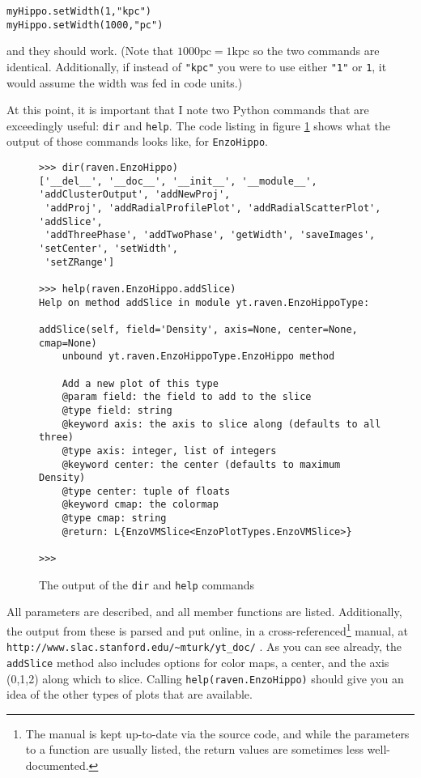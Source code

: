 \documentclass{article}
\begin{document}
\begin{verbatim}
myHippo.setWidth(1,"kpc")
myHippo.setWidth(1000,"pc")
\end{verbatim}

and they should work.  (Note that $1000\mbox{pc} = 1\mbox{kpc}$ so the two commands
are identical.  Additionally, if instead of \texttt{"kpc"} you were to use either
\texttt{"1"} or \texttt{1}, it would assume the width was fed in code units.)

At this point, it is important that I note two Python commands that are exceedingly
useful: \texttt{dir} and \texttt{help}.  The code listing in figure
\ref{dir_and_help} shows what the output of those commands looks like, for
\texttt{EnzoHippo}.

\begin{figure}
\begin{verbatim}
>>> dir(raven.EnzoHippo)
['__del__', '__doc__', '__init__', '__module__', 'addClusterOutput', 'addNewProj',
 'addProj', 'addRadialProfilePlot', 'addRadialScatterPlot', 'addSlice',
 'addThreePhase', 'addTwoPhase', 'getWidth', 'saveImages', 'setCenter', 'setWidth',
 'setZRange']

>>> help(raven.EnzoHippo.addSlice)
Help on method addSlice in module yt.raven.EnzoHippoType:

addSlice(self, field='Density', axis=None, center=None, cmap=None)
    unbound yt.raven.EnzoHippoType.EnzoHippo method

    Add a new plot of this type
    @param field: the field to add to the slice
    @type field: string
    @keyword axis: the axis to slice along (defaults to all three)
    @type axis: integer, list of integers
    @keyword center: the center (defaults to maximum Density)
    @type center: tuple of floats
    @keyword cmap: the colormap
    @type cmap: string
    @return: L{EnzoVMSlice<EnzoPlotTypes.EnzoVMSlice>}

>>>
\end{verbatim}
\caption{\label{dir_and_help}The output of the \texttt{dir} and \texttt{help}
commands}
\end{figure}

All parameters are described, and all member functions are listed.  Additionally,
the output from these is parsed and put online, in a cross-referenced\footnote{The
manual is kept up-to-date via the source code, and while the parameters to a
function are usually listed, the return values are sometimes less well-documented.}
 manual, at \texttt{http://www.slac.stanford.edu/\~{}mturk/yt\_doc/} .  As you can
see already, the \texttt{addSlice} method also includes options for color maps, a
center, and the axis (0,1,2) along which to slice.  Calling
\texttt{help(raven.EnzoHippo)} should give you an idea of the other types of plots
that are available.
\end{document}

